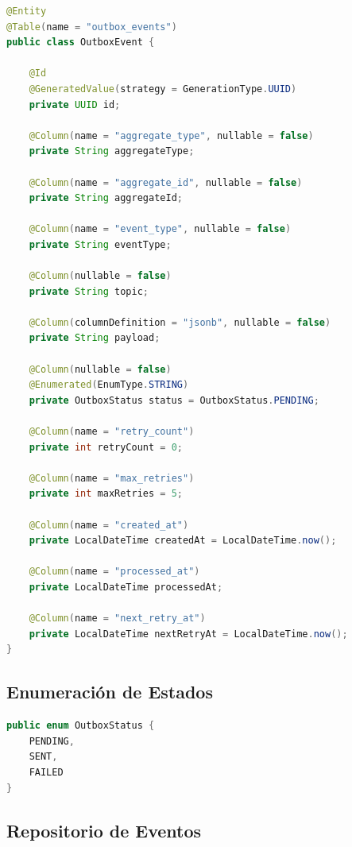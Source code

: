 \begin{lstlisting}[language=Java, caption={Entidad JPA para la tabla Outbox.}]
@Entity
@Table(name = "outbox_events")
public class OutboxEvent {

    @Id
    @GeneratedValue(strategy = GenerationType.UUID)
    private UUID id;

    @Column(name = "aggregate_type", nullable = false)
    private String aggregateType;

    @Column(name = "aggregate_id", nullable = false)
    private String aggregateId;

    @Column(name = "event_type", nullable = false)
    private String eventType;

    @Column(nullable = false)
    private String topic;

    @Column(columnDefinition = "jsonb", nullable = false)
    private String payload;

    @Column(nullable = false)
    @Enumerated(EnumType.STRING)
    private OutboxStatus status = OutboxStatus.PENDING;

    @Column(name = "retry_count")
    private int retryCount = 0;

    @Column(name = "max_retries")
    private int maxRetries = 5;

    @Column(name = "created_at")
    private LocalDateTime createdAt = LocalDateTime.now();

    @Column(name = "processed_at")
    private LocalDateTime processedAt;

    @Column(name = "next_retry_at")
    private LocalDateTime nextRetryAt = LocalDateTime.now();
}
\end{lstlisting}

\subsection{Enumeración de Estados}

\begin{lstlisting}[language=Java, caption={Estados posibles de un evento en la tabla Outbox.}]
public enum OutboxStatus {
    PENDING,
    SENT,
    FAILED
}
\end{lstlisting}

\subsection{Repositorio de Eventos}

